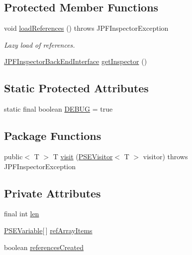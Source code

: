 \subsection*{Protected Member Functions}
\begin{DoxyCompactItemize}
\item 
void \hyperlink{classgov_1_1nasa_1_1jpf_1_1inspector_1_1common_1_1pse_1_1_p_s_e_variable_array_a59996e58ef13fd141a5b4e4cc8724caa}{load\+References} ()  throws J\+P\+F\+Inspector\+Exception 
\begin{DoxyCompactList}\small\item\em Lazy load of references. \end{DoxyCompactList}\item 
\hyperlink{interfacegov_1_1nasa_1_1jpf_1_1inspector_1_1interfaces_1_1_j_p_f_inspector_back_end_interface}{J\+P\+F\+Inspector\+Back\+End\+Interface} \hyperlink{classgov_1_1nasa_1_1jpf_1_1inspector_1_1common_1_1pse_1_1_program_state_entry_ab04eadea7420b70405969a6b95656411}{get\+Inspector} ()
\end{DoxyCompactItemize}
\subsection*{Static Protected Attributes}
\begin{DoxyCompactItemize}
\item 
static final boolean \hyperlink{classgov_1_1nasa_1_1jpf_1_1inspector_1_1common_1_1pse_1_1_program_state_entry_a84ef5e9f23ec651d7a67a8ee72819b0e}{D\+E\+B\+UG} = true
\end{DoxyCompactItemize}
\subsection*{Package Functions}
\begin{DoxyCompactItemize}
\item 
public$<$ T $>$ T \hyperlink{classgov_1_1nasa_1_1jpf_1_1inspector_1_1common_1_1pse_1_1_p_s_e_variable_array_acd5af606b74f3c39493fc18e974be2c8}{visit} (\hyperlink{interfacegov_1_1nasa_1_1jpf_1_1inspector_1_1common_1_1pse_1_1_p_s_e_visitor}{P\+S\+E\+Visitor}$<$ T $>$ visitor)  throws J\+P\+F\+Inspector\+Exception 
\end{DoxyCompactItemize}
\subsection*{Private Attributes}
\begin{DoxyCompactItemize}
\item 
final int \hyperlink{classgov_1_1nasa_1_1jpf_1_1inspector_1_1common_1_1pse_1_1_p_s_e_variable_array_a7cb6045ea0eb2c6175ccf4ef3ba9e141}{len}
\item 
\hyperlink{classgov_1_1nasa_1_1jpf_1_1inspector_1_1common_1_1pse_1_1_p_s_e_variable}{P\+S\+E\+Variable}\mbox{[}$\,$\mbox{]} \hyperlink{classgov_1_1nasa_1_1jpf_1_1inspector_1_1common_1_1pse_1_1_p_s_e_variable_array_aeca8654531f2fe6130cc2645ae3c5ae2}{ref\+Array\+Items}
\item 
boolean \hyperlink{classgov_1_1nasa_1_1jpf_1_1inspector_1_1common_1_1pse_1_1_p_s_e_variable_array_af8b02161a1302b1e93f3519f1a99ab08}{references\+Created}
\end{DoxyCompactItemize}
